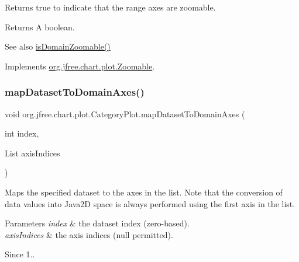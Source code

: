 Returns {\ttfamily true} to indicate that the range axes are zoomable.

\begin{DoxyReturn}{Returns}
A boolean.
\end{DoxyReturn}
\begin{DoxySeeAlso}{See also}
\mbox{\hyperlink{classorg_1_1jfree_1_1chart_1_1plot_1_1_category_plot_a6a2b57b6fac55866636c24ea8fa92469}{is\+Domain\+Zoomable()}} 
\end{DoxySeeAlso}


Implements \mbox{\hyperlink{interfaceorg_1_1jfree_1_1chart_1_1plot_1_1_zoomable_aee592b4d6f620a0571974e29247a66b1}{org.\+jfree.\+chart.\+plot.\+Zoomable}}.

\mbox{\label{classorg_1_1jfree_1_1chart_1_1plot_1_1_category_plot_a8fc92a87b8a93257ba9bd933d6680e2d}} 
\subsubsection{\texorpdfstring{map\+Dataset\+To\+Domain\+Axes()}{mapDatasetToDomainAxes()}}
{\footnotesize\ttfamily void org.\+jfree.\+chart.\+plot.\+Category\+Plot.\+map\+Dataset\+To\+Domain\+Axes (\begin{DoxyParamCaption}\item[{int}]{index,  }\item[{List}]{axis\+Indices }\end{DoxyParamCaption})}

Maps the specified dataset to the axes in the list. Note that the conversion of data values into Java2D space is always performed using the first axis in the list.


\begin{DoxyParams}{Parameters}
{\em index} & the dataset index (zero-\/based). \\
\hline
{\em axis\+Indices} & the axis indices ({\ttfamily null} permitted).\\
\hline
\end{DoxyParams}
\begin{DoxySince}{Since}
1.. 
\end{DoxySince}
\mbox{\label{classorg_1_1jfree_1_1chart_1_1plot_1_1_category_plot_acd6ce8e64e718ebc15642ca578012c26}} 

